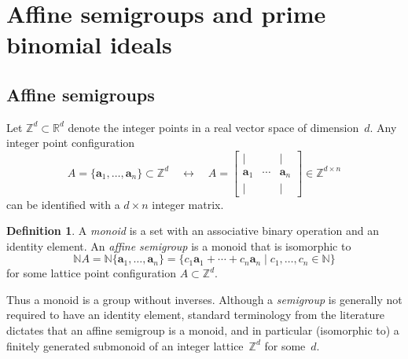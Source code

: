 \documentclass[12pt]{amsart}
\numberwithin{equation}{section}
\theoremstyle{definition}
\newtheorem{defn}[thm]{Definition}
\begin{document}
\section{Affine semigroups and prime binomial ideals}\label{s:affine}

\subsection{Affine semigroups}
Let ${\mathbb{Z}}^d \subset {\mathbb{R}}^d$ denote the integer points in a real vector
space of dimension~$d$.  Any integer point configuration
$$  A = \{{\mathbf{a}}_1,\ldots,{\mathbf{a}}_n\} \subset {\mathbb{Z}}^d
  \quad\longleftrightarrow\quad
  A = \left[
      \begin{array}{ccc}
	  |   &        &   |   \\
	{\mathbf{a}}_1 & \cdots & {\mathbf{a}}_n \\
	  |   &        &   |   
      \end{array}
      \right]
  \in {\mathbb{Z}}^{d \times n}
$$
can be identified with a $d \times n$ integer matrix.

\begin{defn}
A \emph{monoid} is a set with an associative binary operation and an
identity element.  An \emph{affine semigroup} is a monoid that is
isomorphic to
$$  {\mathbb{N}} A = {\mathbb{N}}\{{\mathbf{a}}_1,\ldots,{\mathbf{a}}_n\}
        = \{c_1{\mathbf{a}}_1 + \cdots + c_n{\mathbf{a}}_n \mid c_1,\ldots,c_n \in {\mathbb{N}}\}
$$
for some lattice point configuration $A \subset {\mathbb{Z}}^d$.
\end{defn}

Thus a monoid is a group without inverses.  Although a
\emph{semigroup} is generally not required to have an identity
element, standard terminology from the literature dictates that an
affine semigroup is a monoid, and in particular (isomorphic to) a
finitely generated submonoid of an integer lattice~${\mathbb{Z}}^d$ for
some~$d$.
\end{document}
